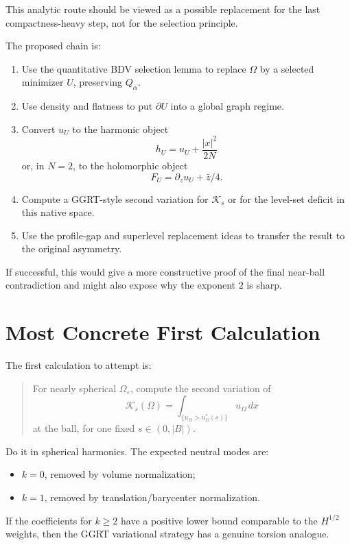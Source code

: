 \documentclass[11pt]{article}
\begin{document}
This analytic route should be viewed as a possible replacement for the last
compactness-heavy step, not for the selection principle.

The proposed chain is:
\begin{enumerate}
\item Use the quantitative BDV selection lemma to replace \(\Omega\) by a
selected minimizer \(U\), preserving \(Q_\alpha\).
\item Use density and flatness to put \(\partial U\) into a global graph regime.
\item Convert \(u_U\) to the harmonic object
\[
h_U=u_U+\frac{|x|^2}{2N}
\]
or, in \(N=2\), to the holomorphic object
\[
F_U=\partial_z u_U+\bar z/4.
\]
\item Compute a GGRT-style second variation for \(\mathcal K_s\) or for the
level-set deficit in this native space.
\item Use the profile-gap and superlevel replacement ideas to transfer the
result to the original asymmetry.
\end{enumerate}
If successful, this would give a more constructive proof of the final near-ball
contradiction and might also expose why the exponent \(2\) is sharp.

\section{Most Concrete First Calculation}

The first calculation to attempt is:

\begin{quote}
For nearly spherical \(\Omega_\varepsilon\), compute the second variation of
\[
\mathcal K_s(\Omega)
=
\int_{\{u_\Omega>u_\Omega^*(s)\}}u_\Omega\,dx
\]
at the ball, for one fixed \(s\in(0,|B|)\).
\end{quote}

Do it in spherical harmonics. The expected neutral modes are:
\begin{itemize}
\item \(k=0\), removed by volume normalization;
\item \(k=1\), removed by translation/barycenter normalization.
\end{itemize}
If the coefficients for \(k\ge2\) have a positive lower bound comparable to the
\(H^{1/2}\) weights, then the GGRT variational strategy has a genuine torsion
analogue.
\end{document}
